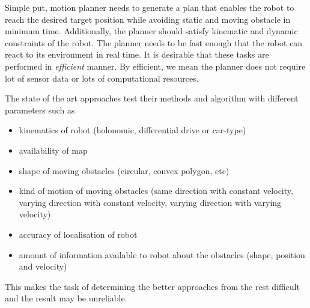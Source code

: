 Simple put, motion planner needs to generate a plan that
enables the robot to reach the desired target position while avoiding static and moving obstacle in minimum time.
Additionally, the planner should satisfy kinematic and dynamic constraints of the robot.
The planner needs to be fast enough that the robot can react to its environment in real time.
It is desirable that these tasks are performed in \textit{efficient} manner. By efficient, we mean 
the planner does not require lot of sensor data or lots of computational resources.

The state of the art approaches test their methods and algorithm with different parameters such as
    \begin{itemize}
        \item kinematics of robot (holonomic, differential drive or car-type)
        \item availability of map
        \item shape of moving obstacles (circular, convex polygon, etc)
        \item kind of motion of moving obstacles (same direction with constant velocity, varying
            direction with constant velocity, varying direction with varying velocity)
        \item accuracy of localisation of robot
        \item amount of information available to robot about the obstacles (shape, position and velocity)
    \end{itemize}
This makes the task of determining the better approaches from the rest difficult and the 
    result may be unreliable.



